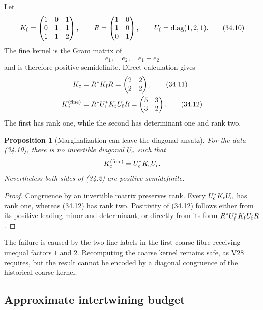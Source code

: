 \documentclass[11pt]{article}
\newtheorem{proposition}[theorem]{Proposition}
\theoremstyle{remark}
\begin{document}
Let
\[
 K_{\rm f}=
 \begin{pmatrix}
 1&0&1\\
 0&1&1\\
 1&1&2
 \end{pmatrix},
 \qquad
 R=
 \begin{pmatrix}
 1&0\\
 1&0\\
 0&1
 \end{pmatrix},
 \qquad
 U_{\rm f}=\operatorname{diag}(1,2,1).            \tag{34.10}
\]
The fine kernel is the Gram matrix of
\[
 e_1,\quad e_2,\quad e_1+e_2
\]
and is therefore positive semidefinite.  Direct calculation gives
\begin{align}
 K_{\rm c}
 &=
 R^*K_{\rm f}R
 =
 \begin{pmatrix}2&2\\2&2\end{pmatrix},            \tag{34.11}\\
 K_{\rm c}^{({\rm fine})}
 &=
 R^*U_{\rm f}^*K_{\rm f}U_{\rm f}R
 =
 \begin{pmatrix}5&3\\3&2\end{pmatrix}.            \tag{34.12}
\end{align}
The first has rank one, while the second has determinant one and
rank two.

\begin{proposition}[Marginalization can leave the diagonal ansatz]
\label{prop:v12v34-counterexample}
For the data (34.10), there is no invertible diagonal \(U_{\rm c}\)
such that
\[
 K_{\rm c}^{({\rm fine})}=U_{\rm c}^*K_{\rm c}U_{\rm c}.
\]
Nevertheless both sides of (34.2) are positive semidefinite.
\end{proposition}

\begin{proof}
Congruence by an invertible matrix preserves rank.  Every
\(U_{\rm c}^*K_{\rm c}U_{\rm c}\) has rank one, whereas (34.12) has
rank two.  Positivity of (34.12) follows either from its positive
leading minor and determinant, or directly from its form
\(R^*U_{\rm f}^*K_{\rm f}U_{\rm f}R\).
\end{proof}

The failure is caused by the two fine labels in the first coarse
fibre receiving unequal factors \(1\) and \(2\).  Recomputing the
coarse kernel remains safe, as V28 requires, but the result cannot
be encoded by a diagonal congruence of the historical coarse kernel.

\subsection{Approximate intertwining budget}
\end{document}
